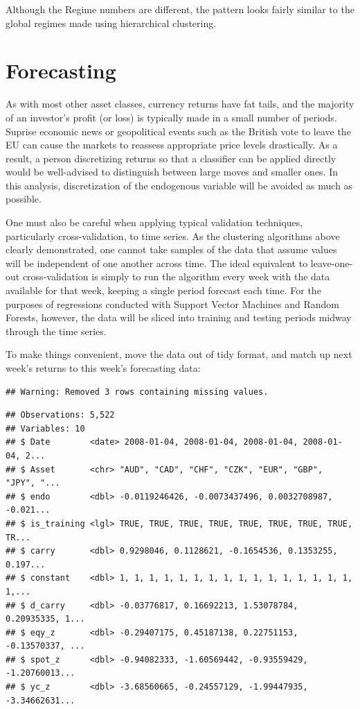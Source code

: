\documentclass[]{article}
\begin{document}
Although the Regime numbers are different, the pattern looks fairly
similar to the global regimes made using hierarchical clustering.

\section{Forecasting}\label{forecasting}

As with most other asset classes, currency returns have fat tails, and
the majority of an investor's profit (or loss) is typically made in a
small number of periods. Suprise economic news or geopolitical events
such as the British vote to leave the EU can cause the markets to
reassess appropriate price levels drastically. As a result, a person
discretizing returns so that a classifier can be applied directly would
be well-advised to distinguish between large moves and smaller ones. In
this analysis, discretization of the endogenous variable will be avoided
as much as possible.

One must also be careful when applying typical validation techniques,
particularly cross-validation, to time series. As the clustering
algorithms above clearly demonstrated, one cannot take samples of the
data that assume values will be independent of one another across time.
The ideal equivalent to leave-one-out cross-validation is simply to run
the algorithm every week with the data available for that week, keeping
a single period forecast each time. For the purposes of regressions
conducted with Support Vector Machines and Random Forests, however, the
data will be sliced into training and testing periods midway through the
time series.

To make things convenient, move the data out of tidy format, and match
up next week's returns to this week's forecasting data:

\begin{verbatim}
## Warning: Removed 3 rows containing missing values.
\end{verbatim}

\begin{verbatim}
## Observations: 5,522
## Variables: 10
## $ Date        <date> 2008-01-04, 2008-01-04, 2008-01-04, 2008-01-04, 2...
## $ Asset       <chr> "AUD", "CAD", "CHF", "CZK", "EUR", "GBP", "JPY", "...
## $ endo        <dbl> -0.0119246426, -0.0073437496, 0.0032708987, -0.021...
## $ is_training <lgl> TRUE, TRUE, TRUE, TRUE, TRUE, TRUE, TRUE, TRUE, TR...
## $ carry       <dbl> 0.9298046, 0.1128621, -0.1654536, 0.1353255, 0.197...
## $ constant    <dbl> 1, 1, 1, 1, 1, 1, 1, 1, 1, 1, 1, 1, 1, 1, 1, 1, 1,...
## $ d_carry     <dbl> -0.03776817, 0.16692213, 1.53078784, 0.20935335, 1...
## $ eqy_z       <dbl> -0.29407175, 0.45187138, 0.22751153, -0.13570337, ...
## $ spot_z      <dbl> -0.94082333, -1.60569442, -0.93559429, -1.20760013...
## $ yc_z        <dbl> -3.68560665, -0.24557129, -1.99447935, -3.34662631...
\end{verbatim}
\end{document}
